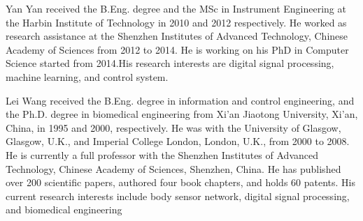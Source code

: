 \documentclass[journal]{IEEEtran}
\begin{document}



\begin{IEEEbiographynophoto}{Yan Yan}
received the B.Eng. degree and the MSc in Instrument Engineering at the Harbin Institute of Technology in 2010 and 2012 respectively. He worked as research assistance at the Shenzhen Institutes of Advanced Technology, Chinese Academy of Sciences from 2012 to 2014. He is working on his PhD in Computer Science started from 2014.His research interests are digital signal processing, machine learning, and control system.
\end{IEEEbiographynophoto}

\begin{IEEEbiographynophoto}{Lei Wang}
received the B.Eng. degree in information and control engineering, and the Ph.D. degree in biomedical engineering from Xi’an Jiaotong University, Xi’an, China, in 1995 and 2000, respectively. He was with the University of Glasgow, Glasgow, U.K., and Imperial College London, London, U.K., from 2000 to 2008. He is currently a full professor with the Shenzhen Institutes of Advanced Technology, Chinese Academy of Sciences, Shenzhen, China. He has published over 200 scientific papers, authored four book chapters, and holds 60 patents. His current research interests include body sensor network, digital signal processing, and biomedical engineering
\end{IEEEbiographynophoto}
\end{document}
